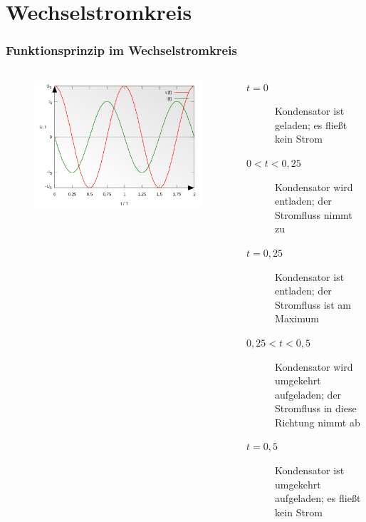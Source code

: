 \section{Wechsel\-strom\-kreis}
\begin{frame}
  \frametitle{Funktionsprinzip im Wechselstromkreis}
  \begin{columns}
    \begin{figure}
      \includegraphics[width=1\textwidth,height=.75\textheight,keepaspectratio]{e05/Sinus_Voltage_and_Current_of_a_Capacitor.png}
    \end{figure}
    {\small
    \begin{block}{}
      \begin{description}
        \item[$t=0$] Kondensator ist geladen; es fließt kein Strom
        \item[$0<t<0,25$] Kondensator wird entladen; der Stromfluss nimmt zu
        \item[$t=0,25$] Kondensator ist entladen; der Stromfluss ist am Maximum
        \item[$0,25<t<0,5$] Kondensator wird umgekehrt aufgeladen; der Stromfluss in diese Richtung nimmt ab
        \item[$t=0,5$] Kondensator ist umgekehrt aufgeladen; es fließt kein Strom
      \end{description}
    \end{block}
    }
  \end{columns}
\end{frame}


